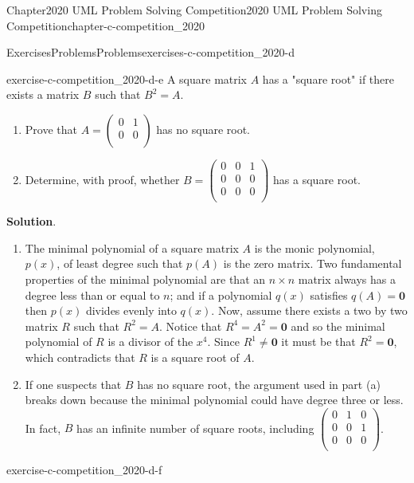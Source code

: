 \documentclass[oneside,10pt,]{book}
\newcommand{\blocktitlefont}{\relax}
\numberwithin{equation}{section}
\begin{document}
\begin{chapterptx}{Chapter}{2020 UML Problem Solving Competition}{}{2020 UML Problem Solving Competition}{}{}{chapter-c-competition_2020}
\begin{exercises-section}{Exercises}{Problems}{}{Problems}{}{}{exercises-c-competition_2020-d}
\begin{divisionexercise}{4}{}{}{exercise-c-competition_2020-d-e}
A square matrix \(A\) has a "square root" if there exists a matrix \(B\) such that \(B^2 = A\).%
\begin{enumerate}[label=(\alph*)]
\item{}Prove that \(A = \left(
\begin{array}{cc}
0 & 1 \\
0 & 0 \\
\end{array}
\right)\)  has no square root.%
\item{}Determine, with proof, whether \(B=\left(
\begin{array}{ccc}
0 & 0 & 1 \\
0 & 0 & 0 \\
0 & 0 & 0 \\
\end{array}
\right)\) has a square root.%
\end{enumerate}
%
\par\smallskip%
\noindent\textbf{\blocktitlefont Solution}.\hypertarget{solution-c-competition_2020-d-e-b}{}\quad{}%
\begin{enumerate}[label=(\alph*)]
\item{}The minimal polynomial of a square matrix \(A\) is the monic polynomial, \(p(x)\), of least degree such that \(p(A)\) is the zero matrix.  Two fundamental properties of the minimal polynomial are that an \(n \times n\) matrix always has a degree less than or equal to \(n\); and if a polynomial \(q(x)\) satisfies \(q(A)=\textbf{0}\) then \(p(x)\) divides evenly into \(q(x)\).  Now, assume there exists a two by two matrix \(R\) such that \(R^2=A\).  Notice that \(R^4 = A^2 = \textbf{0}\) and so the minimal polynomial of \(R\) is a divisor of the \(x^4\).  Since \(R^1 \neq \textbf{0}\) it must be that \(R^2 =\textbf{0}\), which contradicts that \(R\) is a square root of \(A\).%
\item{}If one suspects that \(B\) has no square root, the argument used in part (a) breaks down because the minimal polynomial could have degree three or less.  In fact, \(B\) has  an infinite number of square roots, including \(\left(
\begin{array}{ccc}
0 & 1 & 0 \\
0 & 0 & 1 \\
0 & 0 & 0 \\
\end{array}
\right)\).%
\end{enumerate}
%
\end{divisionexercise}%
\begin{divisionexercise}{5}{}{}{exercise-c-competition_2020-d-f}%

\end{divisionexercise}
\end{exercises-section}
\end{chapterptx}
\end{document}
